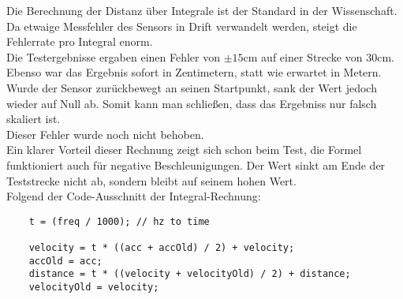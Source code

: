 Die Berechnung der Distanz über Integrale ist der Standard 
in der Wissenschaft. Da etwaige Messfehler des Sensors in Drift verwandelt 
werden, steigt die Fehlerrate pro Integral enorm.\\
Die Testergebnisse ergaben einen Fehler von $\pm15$cm auf einer Strecke
von 30cm. Ebenso war das Ergebnis sofort in Zentimetern, statt wie erwartet in Metern. 
Wurde der Sensor zurückbewegt an seinen Startpunkt, sank
der Wert jedoch wieder auf Null ab. Somit kann man schließen,
dass das Ergebniss nur falsch skaliert ist.\\
Dieser Fehler wurde noch nicht behoben. \\
Ein klarer Vorteil dieser Rechnung zeigt sich schon beim Test,
die Formel funktioniert auch für negative Beschleunigungen.
Der Wert sinkt am Ende der Teststrecke nicht ab, sondern bleibt
auf seinem hohen Wert.\\
Folgend der Code-Ausschnitt der Integral-Rechnung:
\begin{verbatim}
    t = (freq / 1000); // hz to time

    velocity = t * ((acc + accOld) / 2) + velocity;
    accOld = acc;
    distance = t * ((velocity + velocityOld) / 2) + distance;
    velocityOld = velocity;  
\end{verbatim}